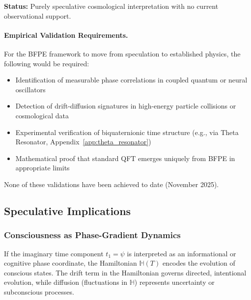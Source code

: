 \textbf{Status:} Purely speculative cosmological interpretation with no current observational support.

\paragraph{Empirical Validation Requirements.}
For the BFPE framework to move from speculation to established physics, the following would be required:
\begin{itemize}
\item Identification of measurable phase correlations in coupled quantum or neural oscillators
\item Detection of drift-diffusion signatures in high-energy particle collisions or cosmological data
\item Experimental verification of biquaternionic time structure (e.g., via Theta Resonator, Appendix~\ref{app:theta_resonator})
\item Mathematical proof that standard QFT emerges uniquely from BFPE in appropriate limits
\end{itemize}

None of these validations have been achieved to date (November 2025).

\subsection{Speculative Implications}
\label{subsec:hamiltonian_speculative}

\begin{center}
\end{center}

\subsubsection{Consciousness as Phase-Gradient Dynamics}

If the imaginary time component $t_1 = \psi$ is interpreted as an informational or cognitive phase coordinate, the Hamiltonian $\mathbb{H}(T)$ encodes the evolution of conscious states. The drift term in the Hamiltonian governs directed, intentional evolution, while diffusion (fluctuations in $\mathbb{H}$) represents uncertainty or subconscious processes.

